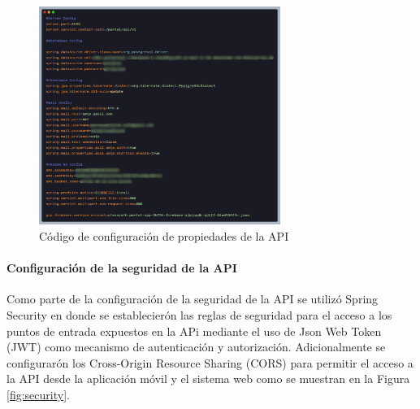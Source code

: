 \begin{figure}[H]
    \centering
    \includegraphics[width=0.7\textwidth]{resources/images/properties}
    \caption{Código de configuración de propiedades de la API}
    \label{fig:api-properties}
\end{figure}

\paragraph{Configuración de la seguridad de la API}

Como parte de la configuración de la seguridad de la API se utilizó Spring Security en donde se establecierón las reglas de seguridad para el acceso a los puntos de entrada expuestos en la APi mediante el uso de Json Web Token (JWT) como mecanismo de autenticación y autorización.
Adicionalmente se configurarón los Cross-Origin Resource Sharing (CORS) para permitir el acceso a la API desde la aplicación móvil y el sistema web como se muestran en la Figura \ref{fig:security}.

